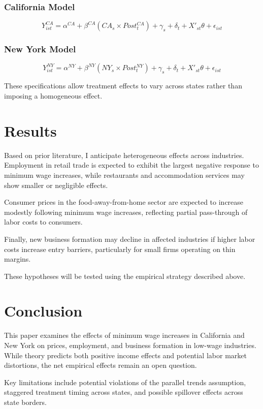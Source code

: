 \documentclass[11pt]{article}
\begin{document}
\subsubsection{California Model}

\[
Y^{CA}_{ist} = \alpha^{CA} + \beta^{CA}(CA_s \times Post^{CA}_t) + \gamma_s + \delta_t + X'_{st}\theta + \epsilon_{ist}
\]

\subsubsection{New York Model}

\[
Y^{NY}_{ist} = \alpha^{NY} + \beta^{NY}(NY_s \times Post^{NY}_t) + \gamma_s + \delta_t + X'_{st}\theta + \epsilon_{ist}
\]

These specifications allow treatment effects to vary across states rather than imposing a homogeneous effect.

\section{Results}

Based on prior literature, I anticipate heterogeneous effects across industries. Employment in retail trade is expected to exhibit the largest negative response to minimum wage increases, while restaurants and accommodation services may show smaller or negligible effects.

Consumer prices in the food-away-from-home sector are expected to increase modestly following minimum wage increases, reflecting partial pass-through of labor costs to consumers.

Finally, new business formation may decline in affected industries if higher labor costs increase entry barriers, particularly for small firms operating on thin margins.

These hypotheses will be tested using the empirical strategy described above.

\section{Conclusion}

This paper examines the effects of minimum wage increases in California and New York on prices, employment, and business formation in low-wage industries. While theory predicts both positive income effects and potential labor market distortions, the net empirical effects remain an open question.

Key limitations include potential violations of the parallel trends assumption, staggered treatment timing across states, and possible spillover effects across state borders.

\nocite{*}



\end{document}
